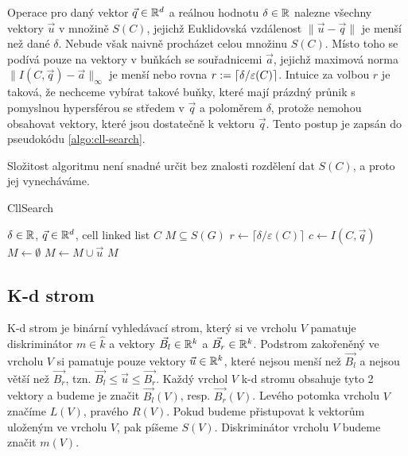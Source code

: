 Operace  pro daný vektor $\vec{q} \in \mathbb{R}^d$ a reálnou hodnotu $\delta \in \mathbb{R}$ nalezne všechny vektory $\vec{u}$ v množině $S(C)$, jejichž Euklidovská vzdálenost $\|\vec{u} - \vec{q}\|$ je menší než dané $\delta$. Nebude však naivně procházet celou množinu $S(C)$. Místo toho se podívá pouze na vektory v buňkách se souřadnicemi $\vec{a}$, jejichž maximová norma $\|I(C, \vec{q}) - \vec{a}\|_\infty$ je menší nebo rovna $r := \lceil\delta / \varepsilon(C)\rceil$. Intuice za volbou $r$ je taková, že nechceme vybírat takové buňky, které mají prázdný průnik s pomyslnou hypersférou se středem v $\vec{q}$ a poloměrem $\delta$, protože nemohou obsahovat vektory, které jsou dostatečně  k vektoru $\vec{q}$. Tento postup je zapsán do pseudokódu \ref{algo:cll-search}.

Složitost algoritmu  není snadné určit bez znalosti rozdělení dat $S(C)$, a proto jej vynecháváme.

\begin{algorithm}[ht!]
  \caption{CllSearch}
  \label{algo:cll-search}
  \begin{algorithmic}
    \Require $\delta \in \mathbb{R}$, $\vec{q} \in \mathbb{R}^d$, cell linked list $C$
    \Ensure $M \subseteq S(G)$
    \State $r \leftarrow \lceil\delta / \varepsilon(C)\rceil$
    \State $c \leftarrow I(C, \vec{q})$
    \State $M \leftarrow \emptyset$
        \State $M \leftarrow M \cup \vec{u}$
      \EndFor
    \EndFor
    \State \Return $M$
  \end{algorithmic}
\end{algorithm}

\subsection{K-d strom}

K-d strom je binární vyhledávací strom, který si ve vrcholu $V$ pamatuje diskriminátor $m \in \hat k$ a vektory $\vec{B_l} \in \mathbb{R}^k$ a $\vec{B_r} \in \mathbb{R}^k$. Podstrom zakořeněný ve vrcholu $V$ si pamatuje pouze vektory $\vec{u} \in \mathbb{R}^k$, které nejsou menší než $\vec{B_l}$ a nejsou větší než $\vec{B_r}$, tzn. $\vec{B_l} \leq \vec{u} \leq \vec{B_r}$. Každý vrchol $V$ k-d stromu obsahuje tyto 2 vektory a budeme je značit $\vec{B_l}(V)$, resp. $\vec{B_r}(V)$. Levého potomka vrcholu $V$ značíme $L(V)$, pravého $R(V)$. Pokud budeme přistupovat k vektorům uloženým ve vrcholu $V$, pak píšeme $S(V)$. Diskriminátor vrcholu $V$ budeme značit $m(V)$.

